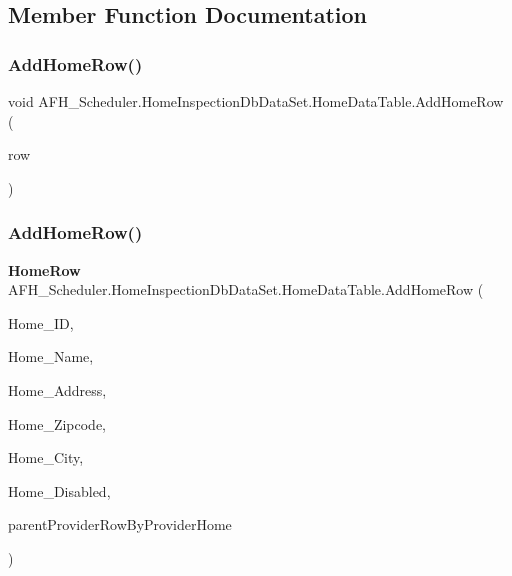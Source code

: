 \subsection{Member Function Documentation}
\mbox{\label{class_a_f_h___scheduler_1_1_home_inspection_db_data_set_1_1_home_data_table_a2c8e95e6e52ff82ba9f1e79e6acc6146}} 
\subsubsection{AddHomeRow()\hspace{0.1cm}{\footnotesize\ttfamily [1/2]}}
{\footnotesize\ttfamily void A\+F\+H\+\_\+\+Scheduler.\+Home\+Inspection\+Db\+Data\+Set.\+Home\+Data\+Table.\+Add\+Home\+Row (\begin{DoxyParamCaption}\item[{\textbf{ Home\+Row}}]{row }\end{DoxyParamCaption})}

\mbox{\label{class_a_f_h___scheduler_1_1_home_inspection_db_data_set_1_1_home_data_table_a9b6492c5bbdbf911e8720e7bbff112b1}} 
\subsubsection{AddHomeRow()\hspace{0.1cm}{\footnotesize\ttfamily [2/2]}}
{\footnotesize\ttfamily \textbf{ Home\+Row} A\+F\+H\+\_\+\+Scheduler.\+Home\+Inspection\+Db\+Data\+Set.\+Home\+Data\+Table.\+Add\+Home\+Row (\begin{DoxyParamCaption}\item[{string}]{Home\+\_\+\+ID,  }\item[{string}]{Home\+\_\+\+Name,  }\item[{string}]{Home\+\_\+\+Address,  }\item[{string}]{Home\+\_\+\+Zipcode,  }\item[{string}]{Home\+\_\+\+City,  }\item[{bool}]{Home\+\_\+\+Disabled,  }\item[{\textbf{ Provider\+Row}}]{parent\+Provider\+Row\+By\+Provider\+Home }\end{DoxyParamCaption})}


